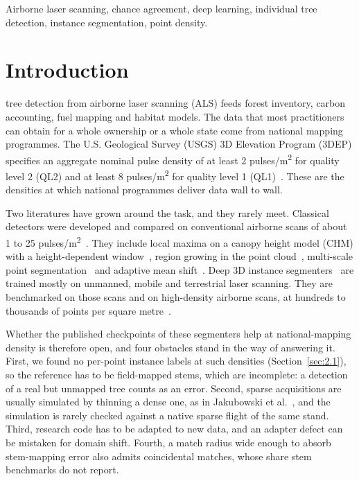\documentclass[journal]{IEEEtran}
\begin{document}
\begin{IEEEkeywords}
Airborne laser scanning, chance agreement, deep learning, individual tree detection, instance segmentation, point density.
\end{IEEEkeywords}

\section{Introduction}\label{sec:1}

 tree detection from airborne laser scanning (ALS) feeds forest
inventory, carbon accounting, fuel mapping and habitat models. The data that
most practitioners can obtain for a whole ownership or a whole state come from
national mapping programmes. The U.S. Geological Survey (USGS) 3D Elevation
Program (3DEP) specifies an aggregate nominal pulse density of at least 2
pulses/m\textsuperscript{2} for quality level 2 (QL2) and at least 8 pulses/m\textsuperscript{2} for quality level 1
(QL1)~\cite{usgs2026topographic}. These are the densities at which national
programmes deliver data wall to wall.

Two literatures have grown around the task, and they rarely meet. Classical
detectors were developed and compared on conventional airborne scans of about 1
to 25 pulses/m\textsuperscript{2}~\cite{kaartinen2012international,jakubowski2013tradeoffs,sparks2022crosscomparison}. They include local maxima on a canopy height model
(CHM) with a height-dependent window~\cite{popescu2004seeing}, region growing in the
point cloud~\cite{li2012new}, multi-scale point segmentation~\cite{vega2014ptrees} and
adaptive mean shift~\cite{ferraz2016lidar}. Deep 3D instance segmenters~\cite{wielgosz2024segmentanytree,xiang2025forestformer3d,xi2025new} are trained
mostly on unmanned, mobile and terrestrial laser scanning. They are benchmarked
on those scans and on high-density airborne scans, at hundreds to thousands of
points per square metre~\cite{puliti2023forinstance,ruoppa2026benchmarking}.

Whether the published checkpoints of these segmenters help at national-mapping
density is therefore open, and four obstacles stand in the way of answering it.
First, we found no per-point instance labels at such densities (Section~\ref{sec:2.1}), so
the reference has to be field-mapped stems, which are incomplete: a detection of
a real but unmapped tree counts as an error. Second, sparse acquisitions are
usually simulated by thinning a dense one, as in Jakubowski et al.~\cite{jakubowski2013tradeoffs}, and
the simulation is rarely checked against a native sparse flight of the same
stand. Third, research code has to be adapted to new data, and an adapter defect
can be mistaken for domain shift. Fourth, a match radius wide enough to absorb
stem-mapping error also admits coincidental matches, whose share stem benchmarks
do not report.
\end{document}
